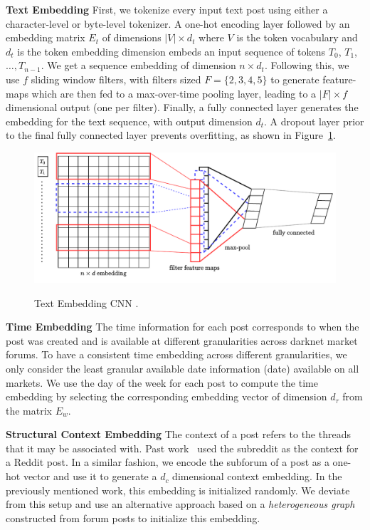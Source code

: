 \noindent \textbf{Text Embedding} First, we tokenize every input text post using either a character-level or byte-level tokenizer. 
A one-hot encoding layer followed by an embedding matrix $E_t$ of dimensions $|V| \times d_t$ where $V$ is the token vocabulary and $d_t$ is the token embedding dimension embeds an input sequence of tokens $T_0$, $T_1$, $\dots, T_{n-1}$.
We get a sequence embedding of dimension $n \times d_t$. 
Following this, we use $f$ sliding window filters, with filters sized $F = \{2, 3, 4, 5\}$ to generate feature-maps which are then fed to a max-over-time pooling layer, leading to a $|F| \times f$ dimensional output (one per filter).
Finally, a fully connected layer generates the embedding for the text sequence, with output dimension $d_t$. 
A dropout layer prior to the final fully connected layer prevents overfitting, as shown in Figure~\ref{fig:kim_cnn}. 
\begin{figure}
    \centering
    \includegraphics[width=\linewidth,alt={Diagram showing neural network for text embedding CNN.}]{sysml/figures/TextCNN.pdf}
    \caption{Text Embedding CNN \cite{kim2014convolutional}.}
    \label{fig:kim_cnn}
\end{figure}

\noindent \textbf{Time Embedding} 
The time information for each post corresponds to when the post was created and is available at different granularities across darknet market forums. 
To have a consistent time embedding across different granularities, we only consider the least granular available date information (date) available on all markets.
We use the day of the week for each post to compute the time embedding 
by selecting the corresponding embedding vector of dimension $d_{\tau}$ from the matrix $E_w$.

\noindent \textbf{Structural Context Embedding} The context of a post refers to the threads that it may be associated with. 
Past work~\cite{andrews2019learning} used the subreddit as the context for a Reddit post.
In a similar fashion, we encode the subforum of a post as a one-hot vector and use it to generate a $d_c$ dimensional context embedding. 
In the previously mentioned work, this embedding is initialized randomly.
We deviate from this setup and use an alternative approach based on a \textit{heterogeneous graph} constructed from forum posts to initialize this embedding. 


